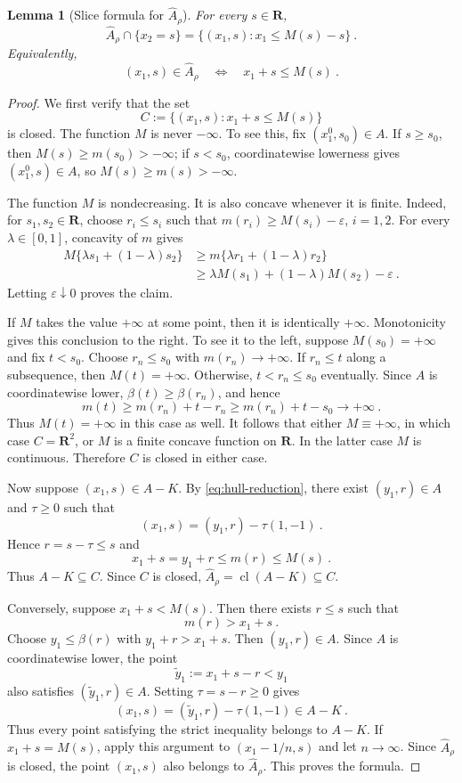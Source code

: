 \documentclass[12pt]{article}
\newtheorem{lemma}{Lemma}
\theoremstyle{remark}
\begin{document}
\begin{lemma}[Slice formula for $\widehat A_\rho$]\label{lem:slice-formula}
For every $s\in\mathbf R$,
\[
\widehat A_\rho\cap\{x_2=s\}
=
\{(x_1,s):x_1\le M(s)-s\}~.
\]
Equivalently,
\[
(x_1,s)\in\widehat A_\rho
\quad\Longleftrightarrow\quad
x_1+s\le M(s)~.
\]
\end{lemma}

\begin{proof}
We first verify that the set
\[
C:=\{(x_1,s):x_1+s\le M(s)\}
\]
is closed.  The function $M$ is never $-\infty$.  To see this, fix
$(x_1^0,s_0)\in A$.  If $s\ge s_0$, then $M(s)\ge m(s_0)>-\infty$; if
$s<s_0$, coordinatewise lowerness gives $(x_1^0,s)\in A$, so
$M(s)\ge m(s)>-\infty$.

The function $M$ is nondecreasing.  It is also concave whenever it is finite.
Indeed, for $s_1,s_2\in\mathbf R$, choose $r_i\le s_i$ such that
$m(r_i)\ge M(s_i)-\varepsilon$, $i=1,2$.  For every $\lambda\in[0,1]$,
concavity of $m$ gives
\begin{align*}
M\{\lambda s_1+(1-\lambda)s_2\}
&\ge m\{\lambda r_1+(1-\lambda)r_2\}\\
&\ge \lambda M(s_1)+(1-\lambda)M(s_2)-\varepsilon~.
\end{align*}
Letting $\varepsilon\downarrow0$ proves the claim.

If $M$ takes the value $+\infty$ at some point, then it is identically
$+\infty$.  Monotonicity gives this conclusion to the right.  To see it to the
left, suppose $M(s_0)=+\infty$ and fix $t<s_0$.  Choose $r_n\le s_0$ with
$m(r_n)\to+\infty$.  If $r_n\le t$ along a subsequence, then $M(t)=+\infty$.
Otherwise, $t<r_n\le s_0$ eventually.  Since $A$ is coordinatewise lower,
$\beta(t)\ge\beta(r_n)$, and hence
\[
m(t)\ge m(r_n)+t-r_n
\ge m(r_n)+t-s_0\longrightarrow+\infty~.
\]
Thus $M(t)=+\infty$ in this case as well.  It follows that either
$M\equiv+\infty$, in which case $C=\mathbf R^2$, or $M$ is a finite concave
function on $\mathbf R$.  In the latter case $M$ is continuous.  Therefore $C$
is closed in either case.

Now suppose $(x_1,s)\in A-K$.  By \eqref{eq:hull-reduction}, there exist
$(y_1,r)\in A$ and $\tau\ge0$ such that
\[
(x_1,s)=(y_1,r)-\tau(1,-1)~.
\]
Hence $r=s-\tau\le s$ and
\[
x_1+s=y_1+r\le m(r)\le M(s)~.
\]
Thus $A-K\subseteq C$.  Since $C$ is closed,
$\widehat A_\rho=\operatorname{cl}(A-K)\subseteq C$.

Conversely, suppose $x_1+s<M(s)$.  Then there exists $r\le s$ such that
\[
m(r)>x_1+s~.
\]
Choose $y_1\le\beta(r)$ with $y_1+r>x_1+s$.  Then $(y_1,r)\in A$.  Since $A$
is coordinatewise lower, the point
\[
\widetilde y_1:=x_1+s-r<y_1
\]
also satisfies $(\widetilde y_1,r)\in A$.  Setting $\tau=s-r\ge0$ gives
\[
(x_1,s)=(\widetilde y_1,r)-\tau(1,-1)\in A-K~.
\]
Thus every point satisfying the strict inequality belongs to $A-K$.  If
$x_1+s=M(s)$, apply this argument to $(x_1-1/n,s)$ and let $n\to\infty$.
Since $\widehat A_\rho$ is closed, the point $(x_1,s)$ also belongs to
$\widehat A_\rho$.  This proves the formula.
\end{proof}
\end{document}
